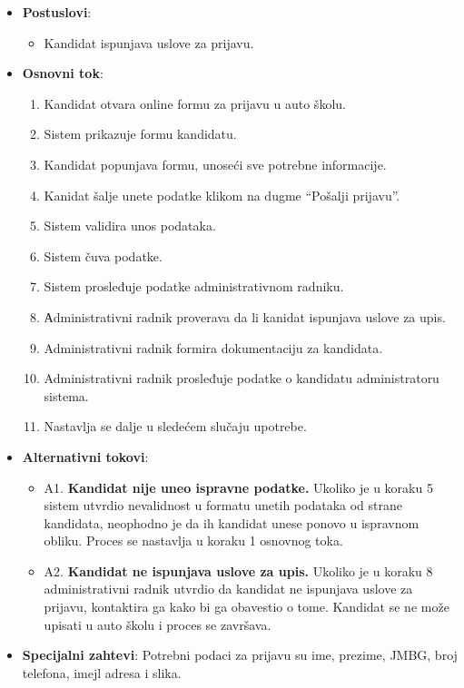 \begin{itemize}
\begin{itemize}
    \end{itemize}
  \item \textbf{Postuslovi}:
      \begin{itemize}
      \item Kandidat ispunjava uslove za prijavu.
      \end{itemize}
  \item \textbf{Osnovni tok}:
      \begin{enumerate}
        \item Kandidat otvara online formu za prijavu u auto školu.
        \item Sistem prikazuje formu kandidatu.
        \item Kandidat popunjava formu, unoseći sve potrebne informacije.
        \item Kanidat šalje unete podatke klikom na dugme “Pošalji prijavu”.
        \item Sistem validira unos podataka.
        \item Sistem čuva podatke.
        \item Sistem prosleđuje podatke administrativnom radniku.
        \item Аdministrativni radnik proverava da li kanidat ispunjava uslove za upis.
        \item Administrativni radnik formira dokumentaciju za kandidata.
        \item Administrativni radnik prosleđuje podatke o kandidatu administratoru sistema.
        \item Nastavlja se dalje u sledećem slučaju upotrebe.
      \end{enumerate}

  \item \textbf{Alternativni tokovi}:
      \begin{itemize}
        \item A1. \textbf{Kandidat nije uneo ispravne podatke.}
        Ukoliko je u koraku 5 sistem utvrdio nevalidnost u formatu unetih podataka od strane kandidata, neophodno je da ih kandidat unese ponovo u ispravnom obliku.
        Proces se nastavlja u koraku 1 osnovnog toka.
        \item A2. \textbf{Kandidat ne ispunjava uslove za upis.}
        Ukoliko je u koraku 8 administrativni radnik utvrdio da kandidat ne ispunjava uslove za prijavu, kontaktira ga kako bi ga obavestio o tome.
        Kandidat se ne može upisati u auto školu i proces se završava.
      \end{itemize}

  \item \textbf{Specijalni zahtevi}:\newline
  Potrebni podaci za prijavu su ime, prezime, JMBG, broj telefona, imejl adresa i slika.
\end{itemize}

